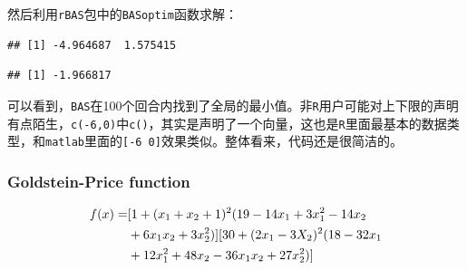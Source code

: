 \documentclass[]{ctexbook}
\newenvironment{Shaded}{\begin{snugshade}}{\end{snugshade}}
\newcommand{\KeywordTok}[1]{\textcolor[rgb]{0.13,0.29,0.53}{\textbf{#1}}}
\newcommand{\DataTypeTok}[1]{\textcolor[rgb]{0.13,0.29,0.53}{#1}}
\newcommand{\DecValTok}[1]{\textcolor[rgb]{0.00,0.00,0.81}{#1}}
\newcommand{\StringTok}[1]{\textcolor[rgb]{0.31,0.60,0.02}{#1}}
\newcommand{\CommentTok}[1]{\textcolor[rgb]{0.56,0.35,0.01}{\textit{#1}}}
\newcommand{\OtherTok}[1]{\textcolor[rgb]{0.56,0.35,0.01}{#1}}
\newcommand{\OperatorTok}[1]{\textcolor[rgb]{0.81,0.36,0.00}{\textbf{#1}}}
\newcommand{\NormalTok}[1]{#1}
\theoremstyle{definition}
\theoremstyle{definition}
\theoremstyle{definition}
\theoremstyle{remark}
\begin{document}
然后利用\texttt{rBAS}包中的\texttt{BASoptim}函数求解：

\begin{Shaded}
\end{Shaded}

\begin{verbatim}
## [1] -4.964687  1.575415
\end{verbatim}

\begin{Shaded}
\end{Shaded}

\begin{verbatim}
## [1] -1.966817
\end{verbatim}

可以看到，\texttt{BAS}在100个回合内找到了全局的最小值。非\texttt{R}用户可能对上下限的声明有点陌生，\texttt{c(-6,0)}中\texttt{c()}，其实是声明了一个向量，这也是\texttt{R}里面最基本的数据类型，和\texttt{matlab}里面的\texttt{{[}-6\ 0{]}}效果类似。整体看来，代码还是很简洁的。

\subsubsection{Goldstein-Price function}\label{BASgold}

\begin{equation}
\begin{split}
f({x})=& [1+(x_1+x_2+1)^2(19-14x_1+3x_1^2-14x_2\notag \\
& +6x_1x_2+3x_2^2)][30+(2x_1-3X_2)^2(18-32x_1\notag  \\
& +12x_1^2+48x_2-36x_1x_2+27x_2^2)]\notag
\end{split}
\end{equation}
\end{document}
